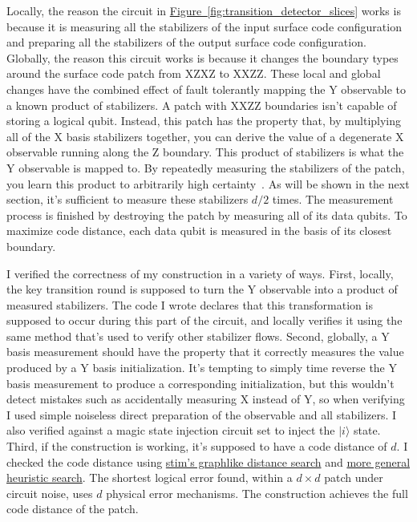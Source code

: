 \documentclass[onecolumn,unpublished,a4paper]{quantumarticle}
\theoremstyle{definition}
\theoremstyle{definition}
\theoremstyle{definition}
\newcommand{\fig}[1]{\hyperref[fig:#1]{Figure~\ref*{fig:#1}}}
\begin{document}
Locally, the reason the circuit in \fig{transition_detector_slices} works is because it is measuring all the stabilizers of the input surface code configuration and preparing all the stabilizers of the output surface code configuration.
Globally, the reason this circuit works is because it changes the boundary types around the surface code patch from XZXZ to XXZZ.
These local and global changes have the combined effect of fault tolerantly mapping the Y observable to a known product of stabilizers.
A patch with XXZZ boundaries isn't capable of storing a logical qubit.
Instead, this patch has the property that, by multiplying all of the X basis stabilizers together, you can derive the value of a degenerate X observable running along the Z boundary.
This product of stabilizers is what the Y observable is mapped to.
By repeatedly measuring the stabilizers of the patch, you learn this product to arbitrarily high certainty~\cite{gidney2022stability}.
As will be shown in the next section, it's sufficient to measure these stabilizers $d/2$ times.
The measurement process is finished by destroying the patch by measuring all of its data qubits.
To maximize code distance, each data qubit is measured in the basis of its closest boundary.

I verified the correctness of my construction in a variety of ways.
First, locally, the key transition round is supposed to turn the Y observable into a product of measured stabilizers.
The code I wrote declares that this transformation is supposed to occur during this part of the circuit, and locally verifies it using the same method that's used to verify other stabilizer flows.
Second, globally, a Y basis measurement should have the property that it correctly measures the value produced by a Y basis initialization.
It's tempting to simply time reverse the Y basis measurement to produce a corresponding initialization, but this wouldn't detect mistakes such as accidentally measuring X instead of Y, so when verifying I used simple noiseless direct preparation of the observable and all stabilizers.
I also verified against a magic state injection circuit set to inject the $|i\rangle$ state.
Third, if the construction is working, it's supposed to have a code distance of $d$.
I checked the code distance using \href{https://github.com/quantumlib/Stim/blob/main/doc/python_api_reference_vDev.md#stim.Circuit.shortest_graphlike_error}{stim's graphlike distance search} and \href{https://github.com/quantumlib/Stim/blob/main/doc/python_api_reference_vDev.md#stim.Circuit.search_for_undetectable_logical_errors}{more general heuristic search}.
The shortest logical error found, within a $d \times d$ patch under circuit noise, uses $d$ physical error mechanisms.
The construction achieves the full code distance of the patch.
\end{document}
